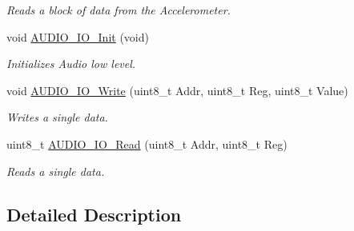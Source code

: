 \begin{DoxyCompactItemize}
\begin{DoxyCompactList}\small\item\em Reads a block of data from the Accelerometer. \end{DoxyCompactList}\item 
void \hyperlink{group__STM32F4__DISCOVERY__LOW__LEVEL__BUS__Functions_gace44c34a627a0fb28c61366b9ca80b78}{A\-U\-D\-I\-O\-\_\-\-I\-O\-\_\-\-Init} (void)
\begin{DoxyCompactList}\small\item\em Initializes Audio low level. \end{DoxyCompactList}\item 
void \hyperlink{group__STM32F4__DISCOVERY__LOW__LEVEL__BUS__Functions_ga269d6aa92989351e75f6d58378e3b9ba}{A\-U\-D\-I\-O\-\_\-\-I\-O\-\_\-\-Write} (uint8\-\_\-t Addr, uint8\-\_\-t Reg, uint8\-\_\-t Value)
\begin{DoxyCompactList}\small\item\em Writes a single data. \end{DoxyCompactList}\item 
uint8\-\_\-t \hyperlink{group__STM32F4__DISCOVERY__LOW__LEVEL__BUS__Functions_gaf8740cdd8dfc7929d23d52d6fcf0901f}{A\-U\-D\-I\-O\-\_\-\-I\-O\-\_\-\-Read} (uint8\-\_\-t Addr, uint8\-\_\-t Reg)
\begin{DoxyCompactList}\small\item\em Reads a single data. \end{DoxyCompactList}\end{DoxyCompactItemize}


\subsection{Detailed Description}


